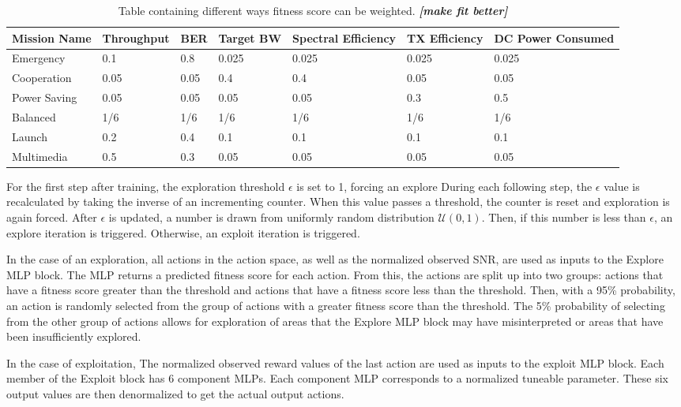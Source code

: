 \begin{table}[ht]
\centering
\begin{tabu} to 1\textwidth{|X[c]|X[c] X[c] X[c] X[c] X[c] X[c]|}
	\hline 
	Mission Name & Throughput&BER&Target BW&Spectral Efficiency&TX Efficiency&DC Power Consumed\\
	\hline
	Emergency& 0.1 &0.8&0.025&0.025&0.025&0.025 \\
	Cooperation&0.05&0.05&0.4&0.4&0.05&0.05\\
	Power Saving&0.05&0.05&0.05&0.05&0.3&0.5\\
	Balanced&1/6&1/6&1/6&1/6&1/6&1/6\\
	Launch&0.2&0.4&0.1&0.1&0.1&0.1\\
	Multimedia&0.5&0.3&0.05&0.05&0.05&0.05\\
	\hline
\end{tabu}
\caption{Table containing different ways fitness score can be weighted. \textit{\textbf{[make fit better]}}}
\label{table:fitMissions}
\end{table}
\par For the first step after training, the exploration threshold $\epsilon$ is set to 1, forcing an explore During each following step, the $\epsilon$ value is recalculated by taking the inverse of an incrementing counter. When this value passes a threshold, the counter is reset and exploration is again forced. After $\epsilon$ is updated, a number is drawn from uniformly random distribution $\mathcal{U}(0,1)$. Then, if this number is less than $\epsilon$, an explore iteration is triggered. Otherwise, an exploit iteration is triggered.
\par In the case of an exploration, all actions in the action space, as well as the normalized observed SNR, are used as inputs to the Explore MLP block. The MLP returns a predicted fitness score for each action. From this, the actions are split up into two groups: actions that have a fitness score greater than the threshold and actions that have a fitness score less than the threshold. Then, with a 95\% probability, an action is randomly selected from the group of actions with a greater fitness score than the threshold. The 5\% probability of selecting from the other group of actions allows for exploration of areas that the Explore MLP block may have misinterpreted or areas that have been insufficiently explored.
\par In the case of exploitation, The normalized observed reward values of the last action are used as inputs to the exploit MLP block. Each member of the Exploit block has 6 component MLPs. Each component MLP corresponds to a normalized tuneable parameter. These six output values are then denormalized to get the actual output actions.
